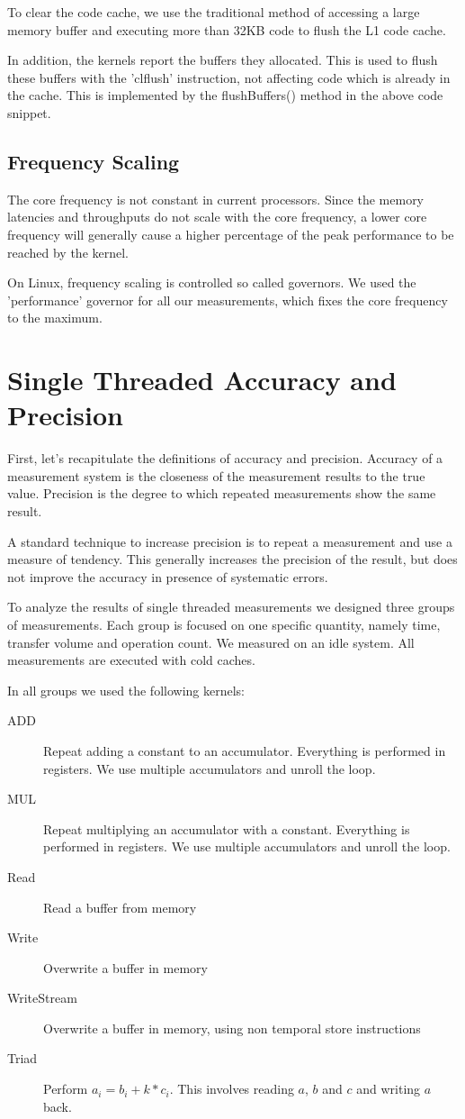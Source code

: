 \documentclass[a4paper,12pt]{article}
\newcommand{\method}[1]{\textsf{#1}}
\begin{document}
To clear the code cache, we use the traditional method of accessing a large
memory buffer and executing more than 32KB code to flush the L1 code cache.

In addition, the kernels report the buffers they allocated. This is used to
flush these buffers with the 'clflush' instruction, not affecting code which is
already in the cache. This is implemented by the \method{flushBuffers()}
method in the above code snippet.

\subsection{Frequency Scaling}
The core frequency is not constant in current processors. Since the memory
latencies and throughputs do not scale with the core frequency, a lower core
frequency will generally cause a higher percentage of the peak performance to be
reached by the kernel.

On Linux, frequency scaling is controlled so called governors. We used the
'performance' governor for all our measurements, which fixes the core frequency
to the maximum.

\section{Single Threaded Accuracy and Precision}
First, let's recapitulate the definitions of accuracy and precision.
\cite{accuracyAndPrecision} Accuracy of a measurement system is the closeness of
the measurement results to the true value.
Precision is the degree to which repeated measurements show the same result.

A standard technique to increase precision is to repeat a measurement and use
a measure of tendency. This generally increases the precision of the result, but
does not improve the accuracy in presence of systematic errors.

To analyze the results of single threaded measurements we designed three groups
of measurements. Each group is focused on one specific quantity, namely time,
transfer volume and operation count. We measured on an idle system. All
measurements are executed with cold caches.

In all groups we used the following kernels:
\begin{description}
\item[ADD] Repeat adding a constant to an accumulator. Everything is performed
in registers. We use multiple accumulators and unroll the loop. 
\item[MUL] Repeat multiplying an accumulator with a constant. Everything is performed
in registers. We use multiple accumulators and unroll the loop. 
\item[Read] Read a buffer from memory
\item[Write] Overwrite a buffer in memory
\item[WriteStream] Overwrite a buffer in memory, using non temporal store
instructions
\item[Triad] Perform $a_i=b_i+k*c_i$. This involves reading $a$, $b$ and $c$ and
writing $a$ back.
\end{description}
\end{document}
